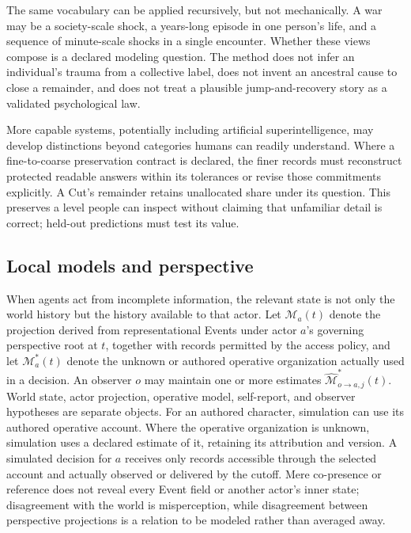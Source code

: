 \documentclass[10pt]{article}
\begin{document}
The same vocabulary can be applied recursively, but not mechanically. A war
may be a society-scale shock, a years-long episode in one person's life, and a
sequence of minute-scale shocks in a single encounter. Whether these views
compose is a declared modeling question. The method does not infer an
individual's trauma from a collective label, does not invent an ancestral cause
to close a remainder, and does not treat a plausible jump-and-recovery story as
a validated psychological law.

More capable systems, potentially including artificial superintelligence,
may develop distinctions beyond categories humans can readily understand.
Where a fine-to-coarse preservation contract is declared, the finer records
must reconstruct protected readable answers within its tolerances or revise
those commitments explicitly. A Cut's remainder retains unallocated share
under its question. This preserves a level people can inspect without claiming
that unfamiliar detail is correct; held-out predictions must test its value.

\subsection{Local models and perspective}
\label{sec:local-models}

When agents act from incomplete information, the relevant state is not only
the world history but the history available to that actor. Let
$\mathcal M_a(t)$ denote the projection derived from representational Events
under actor $a$'s governing perspective root at $t$, together with records
permitted by the access policy,
and let $\mathcal M_a^*(t)$ denote the unknown or authored operative organization
actually used in a decision. An observer $o$ may maintain one or more estimates
$\widehat{\mathcal M}^{*}_{o\rightarrow a,j}(t)$. World state, actor projection,
operative model, self-report, and observer hypotheses are separate objects.
For an authored character, simulation can use its authored operative account.
Where the operative organization is unknown, simulation uses a declared
estimate of it, retaining its attribution and version. A simulated decision
for $a$ receives only records accessible through the selected account and
actually observed or delivered by the cutoff. Mere
co-presence or reference does not reveal every Event field or another actor's
inner state; disagreement with the world is misperception, while
disagreement between perspective projections is a relation to be modeled rather than averaged
away.
\end{document}
